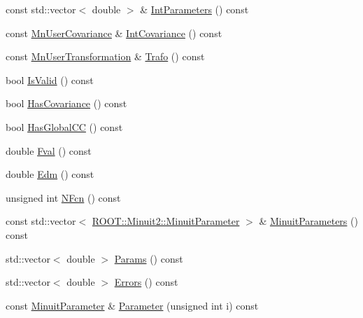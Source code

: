 \begin{DoxyCompactItemize}
\item 
const std\+::vector$<$ double $>$ \& \mbox{\hyperlink{classROOT_1_1Minuit2_1_1MnUserParameterState_a090cbf6f0d6efe452e90e4d9c4425d94}{Int\+Parameters}} () const
\item 
const \mbox{\hyperlink{classROOT_1_1Minuit2_1_1MnUserCovariance}{Mn\+User\+Covariance}} \& \mbox{\hyperlink{classROOT_1_1Minuit2_1_1MnUserParameterState_ad4b67f98845868977a7b7d99c8ffbe2d}{Int\+Covariance}} () const
\item 
const \mbox{\hyperlink{classROOT_1_1Minuit2_1_1MnUserTransformation}{Mn\+User\+Transformation}} \& \mbox{\hyperlink{classROOT_1_1Minuit2_1_1MnUserParameterState_a7184e94a20e923d68f1fb00ab5c549b2}{Trafo}} () const
\item 
bool \mbox{\hyperlink{classROOT_1_1Minuit2_1_1MnUserParameterState_a39247e265c2ae73c1290a8ecd4cd73be}{Is\+Valid}} () const
\item 
bool \mbox{\hyperlink{classROOT_1_1Minuit2_1_1MnUserParameterState_ae2a189c702627adba401bd2654a04254}{Has\+Covariance}} () const
\item 
bool \mbox{\hyperlink{classROOT_1_1Minuit2_1_1MnUserParameterState_aca4004d4a59d41f32f6031b55c0088db}{Has\+Global\+CC}} () const
\item 
double \mbox{\hyperlink{classROOT_1_1Minuit2_1_1MnUserParameterState_ab231f5e0a1fa3314210f7849ab382b86}{Fval}} () const
\item 
double \mbox{\hyperlink{classROOT_1_1Minuit2_1_1MnUserParameterState_a4bf3ac21744e5ffe2d58eec66885f958}{Edm}} () const
\item 
unsigned int \mbox{\hyperlink{classROOT_1_1Minuit2_1_1MnUserParameterState_a21fb0f06261f9bed8359263a99f7d5ca}{N\+Fcn}} () const
\item 
const std\+::vector$<$ \mbox{\hyperlink{classROOT_1_1Minuit2_1_1MinuitParameter}{R\+O\+O\+T\+::\+Minuit2\+::\+Minuit\+Parameter}} $>$ \& \mbox{\hyperlink{classROOT_1_1Minuit2_1_1MnUserParameterState_ae37b475c33d32103702769cbfb1af5a4}{Minuit\+Parameters}} () const
\item 
std\+::vector$<$ double $>$ \mbox{\hyperlink{classROOT_1_1Minuit2_1_1MnUserParameterState_acbdb3b1b3d7f4b9889bf10c2ac3e0785}{Params}} () const
\item 
std\+::vector$<$ double $>$ \mbox{\hyperlink{classROOT_1_1Minuit2_1_1MnUserParameterState_aa8302ffe35dba71f7a6e0131957ec6e4}{Errors}} () const
\item 
const \mbox{\hyperlink{classROOT_1_1Minuit2_1_1MinuitParameter}{Minuit\+Parameter}} \& \mbox{\hyperlink{classROOT_1_1Minuit2_1_1MnUserParameterState_a8fc15966c5874962bb278d4032a312d3}{Parameter}} (unsigned int i) const

\end{DoxyCompactItemize}
